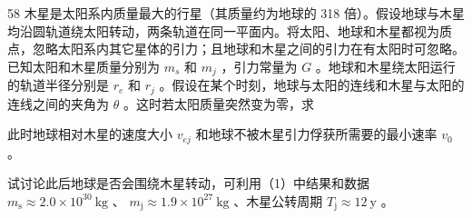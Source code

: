 \begin{problem}[33届物理竞赛复赛]{58}
    木星是太阳系内质量最大的行星（其质量约为地球的 318 倍）。假设地球与木星均沿圆轨道绕太阳转动，两条轨道在同一平面内。将太阳、地球和木星都视为质点，忽略太阳系内其它星体的引力；且地球和木星之间的引力在有太阳时可忽略。已知太阳和木星质量分别为 $m_{s}$ 和 $m_{j}$ ，引力常量为 $G$ 。地球和木星绕太阳运行的轨道半径分别是 $r_{e}$ 和 $r_{j}$ 。假设在某个时刻，地球与太阳的连线和木星与太阳的连线之间的夹角为 $\theta$ 。这时若太阳质量突然变为零，求

    \begin{subproblem}
        此时地球相对木星的速度大小 $v_{ej}$ 和地球不被木星引力俘获所需要的最小速率 $v_{0}$ 。
    \end{subproblem}
    \begin{subproblem}
        试讨论此后地球是否会围绕木星转动，可利用（1）中结果和数据 $m_{\mathrm{s}} \approx 2.0 \times 10^{30} \mathrm{~kg}$ 、 $m_{\mathrm{j}} \approx 1.9 \times 10^{27} \mathrm{~kg}$ 、木星公转周期 $T_{\mathrm{j}} \approx 12 \mathrm{~y}$ 。
    \end{subproblem}
\end{problem}